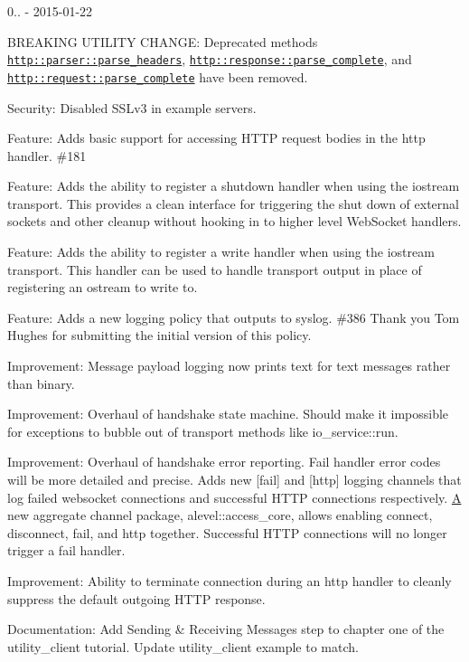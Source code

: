 0.. -\/ 2015-\/01-\/22
\begin{DoxyItemize}
\item B\+R\+E\+A\+K\+I\+NG U\+T\+I\+L\+I\+TY C\+H\+A\+N\+GE\+: Deprecated methods {\ttfamily \href{http::parser::parse_headers}{\tt http\+::parser\+::parse\+\_\+headers}}, {\ttfamily \href{http::response::parse_complete}{\tt http\+::response\+::parse\+\_\+complete}}, and {\ttfamily \href{http::request::parse_complete}{\tt http\+::request\+::parse\+\_\+complete}} have been removed.
\item Security\+: Disabled S\+S\+Lv3 in example servers.
\item Feature\+: Adds basic support for accessing H\+T\+TP request bodies in the http handler. \#181
\item Feature\+: Adds the ability to register a shutdown handler when using the iostream transport. This provides a clean interface for triggering the shut down of external sockets and other cleanup without hooking in to higher level Web\+Socket handlers.
\item Feature\+: Adds the ability to register a write handler when using the iostream transport. This handler can be used to handle transport output in place of registering an ostream to write to.
\item Feature\+: Adds a new logging policy that outputs to syslog. \#386 Thank you Tom Hughes for submitting the initial version of this policy.
\item Improvement\+: Message payload logging now prints text for text messages rather than binary.
\item Improvement\+: Overhaul of handshake state machine. Should make it impossible for exceptions to bubble out of transport methods like {\ttfamily io\+\_\+service\+::run}.
\item Improvement\+: Overhaul of handshake error reporting. Fail handler error codes will be more detailed and precise. Adds new \mbox{[}fail\mbox{]} and \mbox{[}http\mbox{]} logging channels that log failed websocket connections and successful H\+T\+TP connections respectively. \mbox{\hyperlink{struct_a}{A}} new aggregate channel package, {\ttfamily alevel\+::access\+\_\+core}, allows enabling connect, disconnect, fail, and http together. Successful H\+T\+TP connections will no longer trigger a fail handler.
\item Improvement\+: Ability to terminate connection during an http handler to cleanly suppress the default outgoing H\+T\+TP response.
\item Documentation\+: Add Sending \& Receiving Messages step to chapter one of the {\ttfamily utility\+\_\+client} tutorial. Update {\ttfamily utility\+\_\+client} example to match.

\end{DoxyItemize}
